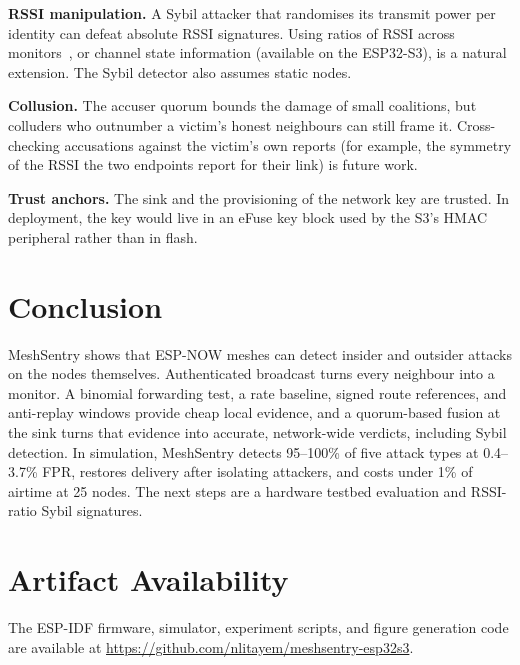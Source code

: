 \documentclass[conference]{IEEEtran}
\begin{document}
\textbf{RSSI manipulation.} A Sybil attacker that randomises its transmit
power per identity can defeat absolute RSSI signatures. Using ratios of RSSI
across monitors~\cite{demirbas2006sybil}, or channel state information
(available on the ESP32-S3), is a natural extension. The Sybil detector also
assumes static nodes.

\textbf{Collusion.} The accuser quorum bounds the damage of small coalitions,
but colluders who outnumber a victim's honest neighbours can still frame it.
Cross-checking accusations against the victim's own reports (for example,
the symmetry of the RSSI the two endpoints report for their link) is future work.

\textbf{Trust anchors.} The sink and the provisioning of the network key are
trusted. In deployment, the key would live in an eFuse key block used by the
S3's HMAC peripheral rather than in flash.

\section{Conclusion}
MeshSentry shows that ESP-NOW meshes can detect insider and outsider attacks
on the nodes themselves. Authenticated broadcast turns every neighbour into
a monitor. A binomial forwarding test, a rate baseline, signed route
references, and anti-replay windows provide cheap local evidence, and a
quorum-based fusion at the sink turns that evidence into accurate, network-wide
verdicts, including Sybil detection. In simulation, MeshSentry detects
95--100\% of five attack types at 0.4--3.7\% FPR, restores delivery after
isolating attackers, and costs under 1\% of airtime at 25 nodes. The next
steps are a hardware testbed evaluation and RSSI-ratio Sybil signatures.

\section*{Artifact Availability}
The ESP-IDF firmware, simulator, experiment scripts, and figure generation
code are available at \url{https://github.com/nlitayem/meshsentry-esp32s3}.



\end{document}
